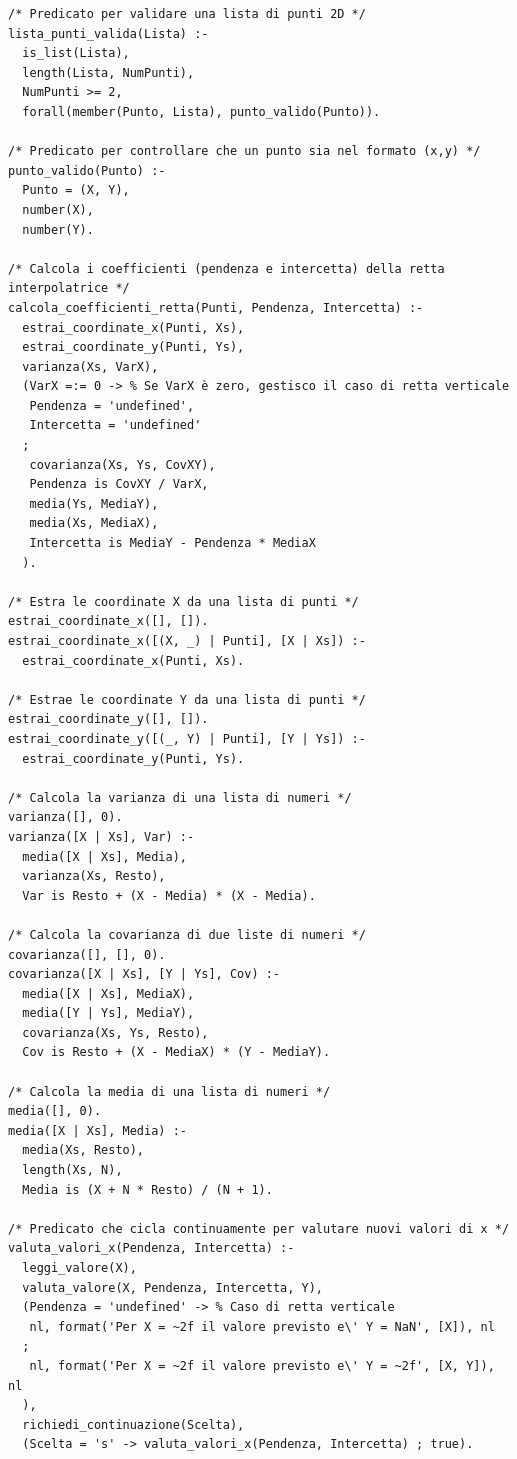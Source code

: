 \documentclass[11pt]{article}
\theoremstyle{definition}
\begin{document}
\begin{verbatim}
/* Predicato per validare una lista di punti 2D */
lista_punti_valida(Lista) :-
  is_list(Lista),
  length(Lista, NumPunti),
  NumPunti >= 2,
  forall(member(Punto, Lista), punto_valido(Punto)).
  
/* Predicato per controllare che un punto sia nel formato (x,y) */
punto_valido(Punto) :- 
  Punto = (X, Y),
  number(X),
  number(Y).

/* Calcola i coefficienti (pendenza e intercetta) della retta interpolatrice */
calcola_coefficienti_retta(Punti, Pendenza, Intercetta) :-
  estrai_coordinate_x(Punti, Xs),
  estrai_coordinate_y(Punti, Ys),
  varianza(Xs, VarX),
  (VarX =:= 0 -> % Se VarX è zero, gestisco il caso di retta verticale
   Pendenza = 'undefined',
   Intercetta = 'undefined'
  ; 
   covarianza(Xs, Ys, CovXY),
   Pendenza is CovXY / VarX,
   media(Ys, MediaY),
   media(Xs, MediaX),
   Intercetta is MediaY - Pendenza * MediaX
  ).
 
/* Estra le coordinate X da una lista di punti */
estrai_coordinate_x([], []).
estrai_coordinate_x([(X, _) | Punti], [X | Xs]) :-
  estrai_coordinate_x(Punti, Xs).
  
/* Estrae le coordinate Y da una lista di punti */
estrai_coordinate_y([], []).
estrai_coordinate_y([(_, Y) | Punti], [Y | Ys]) :-
  estrai_coordinate_y(Punti, Ys).

/* Calcola la varianza di una lista di numeri */  
varianza([], 0).
varianza([X | Xs], Var) :-
  media([X | Xs], Media),
  varianza(Xs, Resto),
  Var is Resto + (X - Media) * (X - Media).
	
/* Calcola la covarianza di due liste di numeri */
covarianza([], [], 0).
covarianza([X | Xs], [Y | Ys], Cov) :-
  media([X | Xs], MediaX),
  media([Y | Ys], MediaY),
  covarianza(Xs, Ys, Resto),
  Cov is Resto + (X - MediaX) * (Y - MediaY).

/* Calcola la media di una lista di numeri */
media([], 0).
media([X | Xs], Media) :-
  media(Xs, Resto),
  length(Xs, N),
  Media is (X + N * Resto) / (N + 1).

/* Predicato che cicla continuamente per valutare nuovi valori di x */
valuta_valori_x(Pendenza, Intercetta) :-
  leggi_valore(X),
  valuta_valore(X, Pendenza, Intercetta, Y),
  (Pendenza = 'undefined' -> % Caso di retta verticale
   nl, format('Per X = ~2f il valore previsto e\' Y = NaN', [X]), nl
  ;
   nl, format('Per X = ~2f il valore previsto e\' Y = ~2f', [X, Y]), nl
  ),
  richiedi_continuazione(Scelta),
  (Scelta = 's' -> valuta_valori_x(Pendenza, Intercetta) ; true).


\end{verbatim}
\end{document}
